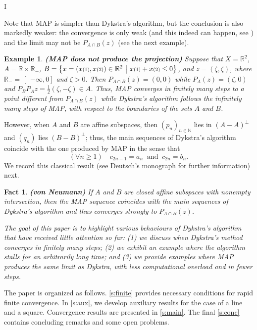 I\documentclass[12pt]{article}
\newcommand{\nnn}{\ensuremath{{n\in{\mathbb N}}}}
\newcommand{\thalb}{\ensuremath{\tfrac{1}{2}}}
\newcommand{\menge}[2]{\big\{{#1}~\big |~{#2}\big\}}
\newcommand{\RR}{\ensuremath{\mathbb R}}
\newcommand{\RM}{\ensuremath{\mathbb{R}_-}}
\newtheorem{example}[theorem]{Example}
\newtheorem{fact}[theorem]{Fact}
\providecommand{\RR}{\mathbb{R}}
\providecommand{\RR}{\mathbb{R}}
\newcommand{\eins}{\ensuremath{\textstyle\mathsmaller{({1})}}}
\newcommand{\zwei}{\ensuremath{\textstyle\mathsmaller{({2})}}}
\begin{document}
Note that MAP is simpler than Dykstra's algorithm, but the conclusion 
is also markedly weaker: the convergence is only weak 
(and this indeed can happen, see \cite{Hundal}) and the limit may 
not be $P_{A\cap B}(z)$ (see the next example). 

\begin{example}{\rm\bf (MAP does not produce the projection)}
\label{ex:MAPbad}
Suppose that $X=\RR^2$, 
$A = \RR\times\RM$,
$B = \menge{x=(x\eins,x\zwei)\in\RR^2}{x\eins+x\zwei\leq 0}$,
and $z = (\zeta,\zeta)$, where $\RM = \left]-\infty,0\right]$ and $\zeta > 0$.  
Then $P_{A\cap B}(z) = (0,0)$ while 
$P_A(z) = (\zeta,0)$ and $P_BP_Az = \thalb(\zeta,-\zeta)\in A$. 
Thus, MAP converges in finitely many steps to a point different from
$P_{A\cap B}(z)$ while Dykstra's algorithm follows 
the infinitely many steps of MAP, 
with respect to the boundaries of the sets $A$ and $B$. 
\end{example}

However, when $A$ and $B$ are affine subspaces,
then $(p_n)_\nnn$ lies in $(A-A)^\perp$ and 
$(q_n)$ lies $(B-B)^\perp$; thus, 
the main sequences of Dykstra's algorithm coincide with 
the one produced by MAP in the sense that 
\begin{equation}
(\forall n\geq 1)\quad
c_{2n-1} = a_n 
\;\;\text{and}\;\;
c_{2n} = b_n.
\end{equation}
We record this classical result 
(see Deutsch's monograph \cite{Deutsch} for further information) next.

\begin{fact} {\rm\bf (von Neumann)}
\label{f:vN}
If $A$ and $B$ are closed affine subspaces with nonempty intersection, 
then the MAP sequence coincides with the main sequences of 
Dykstra's algorithm and thus converges strongly to $P_{A\cap B}(z)$.
\end{fact}

\emph{
The goal of this paper is to highlight various behaviours of 
Dykstra's algorithm that have received little attention so far:
(1) we discuss when Dykstra's method converges in finitely many steps;
(2) we exhibit an example where the algorithm stalls 
for an arbitrarily long time; and (3) we provide examples where 
MAP produces the same limit as Dykstra, with less computational 
overload and in fewer steps.
}

The paper is organized as follows.
\cref{s:finite} provides necessary conditions for rapid finite convergence.
In \cref{s:aux}, we develop auxiliary results for the case of a line and
a square. 
Convergence results are presented in \cref{s:main}.
The final \cref{s:conc} contains concluding remarks and 
some open problems.
\end{document}
